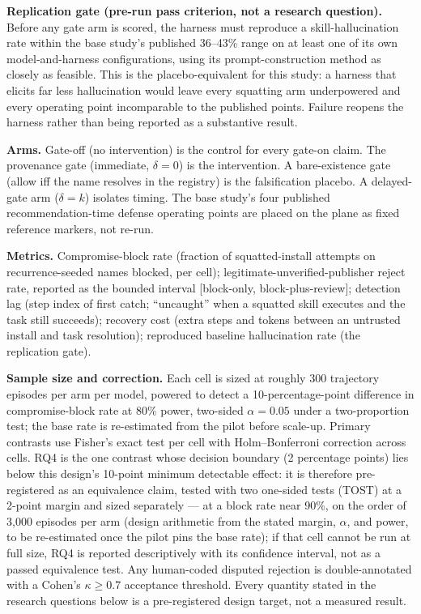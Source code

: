 \documentclass[11pt]{article}
\begin{document}
\textbf{Replication gate (pre-run pass criterion, not a research question).} Before any gate arm is scored, the harness must reproduce a skill-hallucination rate within the base study's published 36--43\% range on at least one of its own model-and-harness configurations, using its prompt-construction method as closely as feasible. This is the placebo-equivalent for this study: a harness that elicits far less hallucination would leave every squatting arm underpowered and every operating point incomparable to the published points. Failure reopens the harness rather than being reported as a substantive result.

\textbf{Arms.} Gate-off (no intervention) is the control for every gate-on claim. The provenance gate (immediate, $\delta = 0$) is the intervention. A bare-existence gate (allow iff the name resolves in the registry) is the falsification placebo. A delayed-gate arm ($\delta = k$) isolates timing. The base study's four published recommendation-time defense operating points are placed on the plane as fixed reference markers, not re-run.

\textbf{Metrics.} Compromise-block rate (fraction of squatted-install attempts on recurrence-seeded names blocked, per cell); legitimate-unverified-publisher reject rate, reported as the bounded interval [block-only, block-plus-review]; detection lag (step index of first catch; ``uncaught'' when a squatted skill executes and the task still succeeds); recovery cost (extra steps and tokens between an untrusted install and task resolution); reproduced baseline hallucination rate (the replication gate).

\textbf{Sample size and correction.} Each cell is sized at roughly 300 trajectory episodes per arm per model, powered to detect a 10-percentage-point difference in compromise-block rate at 80\% power, two-sided $\alpha = 0.05$ under a two-proportion test; the base rate is re-estimated from the pilot before scale-up. Primary contrasts use Fisher's exact test per cell with Holm--Bonferroni correction across cells. RQ4 is the one contrast whose decision boundary (2 percentage points) lies below this design's 10-point minimum detectable effect: it is therefore pre-registered as an equivalence claim, tested with two one-sided tests (TOST) at a 2-point margin and sized separately --- at a block rate near 90\%, on the order of 3{,}000 episodes per arm (design arithmetic from the stated margin, $\alpha$, and power, to be re-estimated once the pilot pins the base rate); if that cell cannot be run at full size, RQ4 is reported descriptively with its confidence interval, not as a passed equivalence test. Any human-coded disputed rejection is double-annotated with a Cohen's $\kappa \geq 0.7$ acceptance threshold. Every quantity stated in the research questions below is a pre-registered design target, not a measured result.
\end{document}
